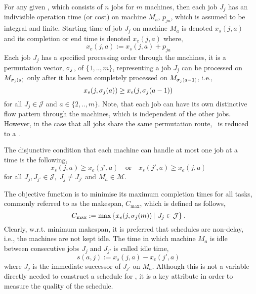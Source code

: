 For any given \JSP, which consists of $n$ jobs for $m$ machines, then each job 
$J_j$ has an indivisible operation time (or cost) on machine $M_a$, $p_{ja}$, 
which is assumed to be integral and finite. 
Starting time of job $J_j$ on machine $M_a$ is denoted $x_s(j,a)$ and its 
completion or end time is denoted $x_e(j,a)$ where, 
\begin{equation}  x_e(j,a):=x_s(j,a)+p_{ja} \end{equation} 
Each job $J_j$ has a specified processing order through the machines, it is a permutation vector, ${\mathbf{\sigma}}_j$, of $\{1,..,m\}$, representing a job $J_j$ can be processed on $M_{{\mathbf{\sigma}}_j(a)}$ only after it has been completely processed on $M_{{\mathbf{\sigma}}_j(a-1)}$, i.e.,
\begin{equation}\label{eq:permutation}
	x_s(j,\vsigma_j(a)) \geq x_e(j,\vsigma_j(a-1)) 
\end{equation}
for all $J_j\in\mathcal{J}$ and $a\in\{2,..,m\}$. 
Note, that each job can have its own distinctive flow pattern through the 
machines, which is independent of the other jobs. However, in the case that all 
jobs share the same permutation route, \JSP\ is reduced to a \FSP.

The disjunctive condition that each machine can handle at most one job at a time is the following,
\begin{equation}\label{eq:oneJobPerMac}
	x_s(j,a) \geq x_e(j',a) \quad\textrm{or}\quad x_s(j',a) \geq x_e(j,a)  
\end{equation}
for all $J_j,J_{j'}\in\mathcal{J},\; J_j\neq J_{j'}$ and $M_a\in\mathcal{M}$. 

The objective function is to minimise its maximum completion times for all tasks, commonly referred to as the makespan, $C_{\max}$, which is defined as follows,
\begin{equation}
	C_{\max} := 
	\max\condset{x_e(j,\vsigma_j(m))}{J_j\in\mathcal{J}}.\label{eq:makespan}
\end{equation} 
Clearly, w.r.t. minimum makespan, it is preferred that schedules are non-delay, 
i.e., the machines are not kept idle. The time in which machine $M_a$ is idle 
between consecutive jobs $J_j$ and $J_{j'}$ is called idle time, 
\begin{equation} s(a,j):=x_s(j,a)-x_e(j',a) \label{eq:slack}\end{equation}
where $J_j$ is the immediate successor of $J_{j'}$ on $M_a$. Although this is 
not a variable directly needed to construct a schedule for \JSP, it is a key 
attribute in order to measure the quality of the schedule. 

